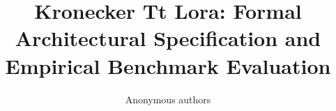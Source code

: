 \title{\textbf{Kronecker Tt Lora: Formal Architectural Specification and Empirical Benchmark Evaluation}}

\author{Anonymous authors}
